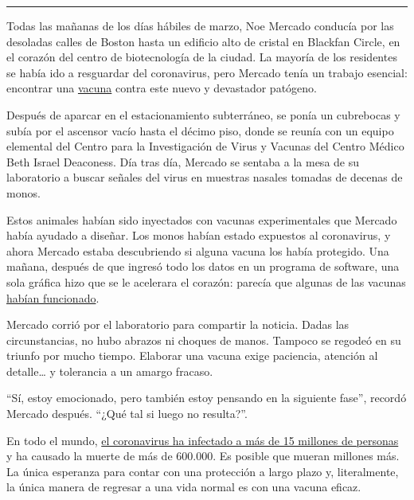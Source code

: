 \begin{center}\rule{0.5\linewidth}{\linethickness}\end{center}

Todas las mañanas de los días hábiles de marzo, Noe Mercado conducía por
las desoladas calles de Boston hasta un edificio alto de cristal en
Blackfan Circle, en el corazón del centro de biotecnología de la ciudad.
La mayoría de los residentes se había ido a resguardar del coronavirus,
pero Mercado tenía un trabajo esencial: encontrar una
\href{https://www.nytimes3xbfgragh.onion/2020/07/20/world/covid-coronavirus-vaccine.html}{vacuna}
contra este nuevo y devastador patógeno.

Después de aparcar en el estacionamiento subterráneo, se ponía un
cubrebocas y subía por el ascensor vacío hasta el décimo piso, donde se
reunía con un equipo elemental del Centro para la Investigación de Virus
y Vacunas del Centro Médico Beth Israel Deaconess. Día tras día, Mercado
se sentaba a la mesa de su laboratorio a buscar señales del virus en
muestras nasales tomadas de decenas de monos.

Estos animales habían sido inyectados con vacunas experimentales que
Mercado había ayudado a diseñar. Los monos habían estado expuestos al
coronavirus, y ahora Mercado estaba descubriendo si alguna vacuna los
había protegido. Una mañana, después de que ingresó todo los datos en un
programa de software, una sola gráfica hizo que se le acelerara el
corazón: parecía que algunas de las vacunas
\href{https://www.nytimes3xbfgragh.onion/2020/05/20/health/coronavirus-vaccine-harvard.html}{habían
funcionado}.

Mercado corrió por el laboratorio para compartir la noticia. Dadas las
circunstancias, no hubo abrazos ni choques de manos. Tampoco se regodeó
en su triunfo por mucho tiempo. Elaborar una vacuna exige paciencia,
atención al detalle\ldots{} y tolerancia a un amargo fracaso.

``Sí, estoy emocionado, pero también estoy pensando en la siguiente
fase'', recordó Mercado después. ``¿Qué tal si luego no resulta?''.

En todo el mundo,
\href{https://www.nytimes3xbfgragh.onion/interactive/2020/world/coronavirus-maps.html}{el
coronavirus ha infectado a más de 15 millones de personas} y ha causado
la muerte de más de 600.000. Es posible que mueran millones más. La
única esperanza para contar con una protección a largo plazo y,
literalmente, la única manera de regresar a una vida normal es con una
vacuna eficaz.

